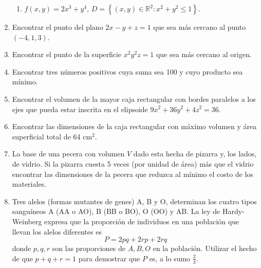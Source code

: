 \documentclass[fleqn, 12pt]{article}
\begin{document}
\begin{enumerate}
\begin{enumerate}
            \item $ f(x,y) = 2x^3 + y^4, \, D = \left\lbrace (x,y) \in \mathbb{R}^2 : x^2 + y^2 \leq 1 \right\rbrace $.
            
        \end{enumerate}
        \item Encontrar el punto del plano $ 2x - y + z = 1 $ que sea más cercano al punto $ (-4,1,3) $.
        

        \item Encontrar el punto de la superficie $ x^2 y^2 z = 1 $ que sea más cercano al origen.
        
        
        \item Encontrar tres números positivos cuya suma sea 100 y cuyo producto sea mínimo.
    

        \item Encontrar el volumen de la mayor caja rectangular con bordes paralelos a los ejes que pueda estar inscrita en el elipsoide $ 9x^2 + 36y^2 + 4z^2 = 36 $.
        

        \item Encontrar las dimensiones de la caja rectangular con máximo volumen y área superficial total de 64 cm$ ^2 $.
        

        \item La base de una pecera con volumen $ V $ dado esta hecha de pizarra y, los lados, de vidrio. Si la pizarra cuesta 5 veces (por unidad de área) más que el vidrio encontrar las dimensiones de la pecera que reduzca al mínimo el costo de los materiales.
        

        \item Tres alelos (formas mutantes de genes) A, B y O, determinan los cuatro tipos sanguíneos A (AA o AO), B (BB o BO), O (OO) y AB. La ley de Hardy-Weinberg expresa que la proporción de individuos en una población que llevan los alelos diferentes es
        $$ P = 2pq + 2rp + 2rq $$
        donde $ p, q, r $ son las proporciones de $ A, B, O $ en la población. Utilizar el hecho de que $ p + q + r = 1 $ para demostrar que $ P $ es, a lo sumo $ \frac{2}{3} $.



\end{enumerate}
\end{document}

